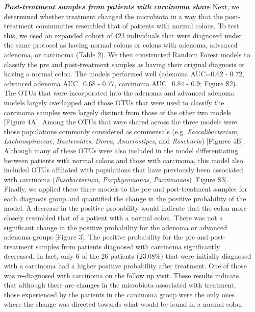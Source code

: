 \documentclass[12pt,]{article}
\begin{document}
\textbf{\emph{Post-treatment samples from patients with carcinoma
share}} Next, we determined whether treatment changed the microbiota in
a way that the post-treatment communities resembled that of patients
with normal colons. To test this, we used an expanded cohort of 423
individuals that were diagnosed under the same protocol as having normal
colons or colons with adenoma, advanced adenoma, or carcinoma (Table 2).
We then constructed Random Forest models to classify the pre and
post-treatment samples as having their original diagnosis or having a
normal colon. The models performed well (adenoma AUC=0.62 - 0.72,
advanced adenoma AUC=0.68 - 0.77, carcinoma AUC=0.84 - 0.9; Figure S2).
The OTUs that were incorporated into the adenoma and advanced adenoma
models largely overlapped and those OTUs that were used to classify the
carcinoma samples were largely distinct from those of the other two
models {[}Figure 4A{]}. Among the OTUs that were shared across the three
models were those populations commonly considered as commensals (e.g.
\emph{Faecalibacterium}, \emph{Lachnospiraceae}, \emph{Bacteroides},
\emph{Dorea}, \emph{Anaerostipes}, and \emph{Roseburia}) {[}Figures
4B{]}. Although many of these OTUs were also included in the model
differentiating between patients with normal colons and those with
carcinoma, this model also included OTUs affiliated with populations
that have previously been associated with carcinoma
(\emph{Fusobacterium}, \emph{Porphyromonas}, \emph{Parvimonas})
{[}Figure S3{]}. Finally, we applied these three models to the pre and
post-treatment samples for each diagnosis group and quantified the
change in the positive probability of the model. A decrease in the
positive probability would indicate that the colon more closely
resembled that of a patient with a normal colon. There was not a
significant change in the positive probability for the adenoma or
advanced adenoma groups {[}Figure 3{]}. The positive probability for the
pre and post-treatment samples from patients diagnosed with carcinoma
significantly decreased. In fact, only 6 of the 26 patients (23.08\%)
that were initially diagnosed with a carcinoma had a higher positive
probability after treatment. One of those was re-diagnosed with
carcinoma on the follow up visit. These results indicate that although
there are changes in the microbiota associated with treatment, those
experienced by the patients in the carcinoma group were the only ones
where the change was directed towards what would be found in a normal
colon
\end{document}
